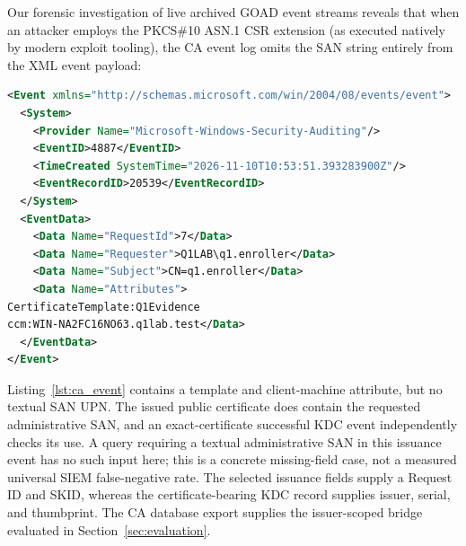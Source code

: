 Our forensic investigation of live archived GOAD event streams reveals that when an attacker employs the PKCS\#10 ASN.1 CSR extension (as executed natively by modern exploit tooling), the CA event log omits the SAN string entirely from the XML event payload:
\begin{lstlisting}[language=XML,caption={Selected fields from the independent 2019 enabled-condition capture: Security record 20539. The raw XML is retained in the artifact.},label=lst:ca_event]
<Event xmlns="http://schemas.microsoft.com/win/2004/08/events/event">
  <System>
    <Provider Name="Microsoft-Windows-Security-Auditing"/>
    <EventID>4887</EventID>
    <TimeCreated SystemTime="2026-11-10T10:53:51.393283900Z"/>
    <EventRecordID>20539</EventRecordID>
  </System>
  <EventData>
    <Data Name="RequestId">7</Data>
    <Data Name="Requester">Q1LAB\q1.enroller</Data>
    <Data Name="Subject">CN=q1.enroller</Data>
    <Data Name="Attributes">
CertificateTemplate:Q1Evidence
ccm:WIN-NA2FC16NO63.q1lab.test</Data>
  </EventData>
</Event>
\end{lstlisting}

Listing~\ref{lst:ca_event} contains a template and client-machine attribute, but no textual SAN UPN. The issued public certificate does contain the requested administrative SAN, and an exact-certificate successful KDC event independently checks its use. A query requiring a textual administrative SAN in this issuance event has no such input here; this is a concrete missing-field case, not a measured universal SIEM false-negative rate. The selected issuance fields supply a Request ID and SKID, whereas the certificate-bearing KDC record supplies issuer, serial, and thumbprint. The CA database export supplies the issuer-scoped bridge evaluated in Section~\ref{sec:evaluation}.
